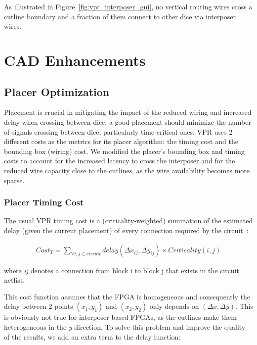 \documentclass[journal]{IEEEtran}
\begin{document}
As illustrated in Figure~\ref{fig:vpr_interposer_gui}, no vertical routing wires cross a cutline boundary and a fraction of them connect to other dice via interposer wires.


\section{CAD Enhancements}
\label{cadSection}

\subsection{Placer Optimization}
\label{cad_enh_placer_subsection}
Placement is crucial in mitigating the impact of the reduced wiring and increased delay when crossing between dice; a good placement should minimize the number of signals crossing between dice, particularly time-critical ones. VPR uses 2 different costs as the metrics for its placer algorithm: the timing cost and the bounding box (wiring) cost. We modified the placer's bounding box and timing costs to account for the increased latency to cross the interposer and for the reduced wire capacity close to the cutlines, as the wire availability becomes more sparse.

\subsubsection{Placer Timing Cost}
The usual VPR timing cost is a (criticality-weighted) summation of the estimated delay (given the current placement) of every connection required by the circuit~\cite{timing2000}:

 
\setlength{\arraycolsep}{0.0em}
\begin{multline}
\label{eq:timing_eq_full}
Cost_{T}=\sum_{\forall i, j \subset circuit} delay(\Delta x_{ij},\Delta y_{ij}) \times 
Criticality(i,j)
\end{multline}
\setlength{\arraycolsep}{5pt}

where \textit{ij} denotes a connection from block i to block j that exists in the circuit netlist.

This cost function assumes that the FPGA is homogeneous and consequently the delay between 2 points $(x_1,y_1)$ and $(x_2,y_2)$ only depends on $(\Delta x,\Delta y)$. This is obviously not true for interposer-based FPGAs, as the cutlines make them heterogeneous in the \textit{y} direction. To solve this problem and improve the quality of the results, we add an extra term to the delay function:
\end{document}
